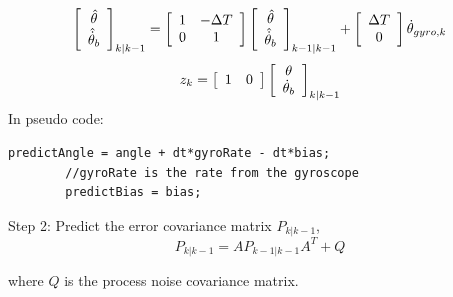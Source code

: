 \documentclass[a4paper]{report}
\begin{document}
		\begin{equation}
		\left[
      		\begin{array}{c}
      		\hat{\theta}\\
		\hat{\dot{\theta}}_{b}
      		\end{array} \right]_{k|k-1}
		=
		\left[
		\begin{array}{c c}
		1 & - \Delta T\\
		0 & 1
		\end{array} \right]
		\left[
		\begin{array}{c}
		\hat{\theta}\\
		\hat{\dot{\theta}}_{b}
		\end{array} \right]_{k-1|k-1}
		+
		\left[
		\begin{array}{c}
		\Delta T\\
		0
		\end{array} \right]
		\dot{\theta}_{gyro, k}\\
		\end{equation}
		\begin{equation*}
		z_{k}=
		\left[
		\begin{array}{c c}
		1 & 0
		\end{array} \right]
		\left[
		\begin{array}{c}
		\theta\\
		\dot{\theta}_{b}
		\end{array} \right]_{k|k-1}
		\end{equation*}
    In pseudo code:
    \begin{lstlisting}[frame=single]
		predictAngle = angle + dt*gyroRate - dt*bias;
		//gyroRate is the rate from the gyroscope
		predictBias = bias;
		\end{lstlisting}

		Step 2: Predict the error covariance matrix $P_{k|k-1}$,
		\begin{equation}
		P_{k|k-1}=AP_{k-1|k-1}A^{T}+Q
		\end{equation}

		where $Q$ is the process noise covariance matrix.
\end{document}
